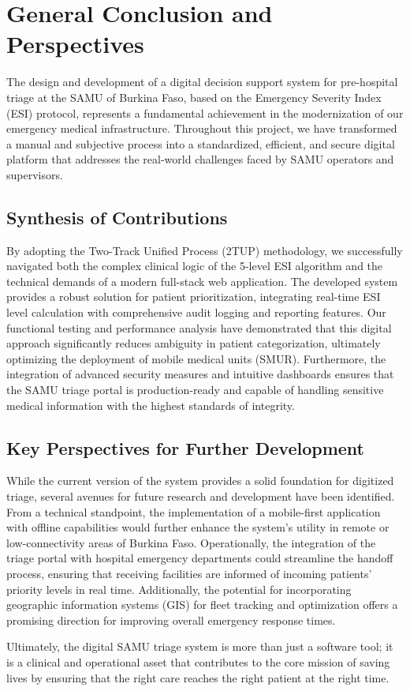 \chapter*{General Conclusion and Perspectives}
\thispagestyle{fancy}
\justifying

The design and development of a digital decision support system for pre-hospital triage at the SAMU of Burkina Faso, based on the Emergency Severity Index (ESI) protocol, represents a fundamental achievement in the modernization of our emergency medical infrastructure. Throughout this project, we have transformed a manual and subjective process into a standardized, efficient, and secure digital platform that addresses the real-world challenges faced by SAMU operators and supervisors.

\section*{Synthesis of Contributions}
By adopting the Two-Track Unified Process (2TUP) methodology, we successfully navigated both the complex clinical logic of the 5-level ESI algorithm and the technical demands of a modern full-stack web application. The developed system provides a robust solution for patient prioritization, integrating real-time ESI level calculation with comprehensive audit logging and reporting features. Our functional testing and performance analysis have demonstrated that this digital approach significantly reduces ambiguity in patient categorization, ultimately optimizing the deployment of mobile medical units (SMUR). Furthermore, the integration of advanced security measures and intuitive dashboards ensures that the SAMU triage portal is production-ready and capable of handling sensitive medical information with the highest standards of integrity.

\section*{Key Perspectives for Further Development}
While the current version of the system provides a solid foundation for digitized triage, several avenues for future research and development have been identified. From a technical standpoint, the implementation of a mobile-first application with offline capabilities would further enhance the system's utility in remote or low-connectivity areas of Burkina Faso. Operationally, the integration of the triage portal with hospital emergency departments could streamline the handoff process, ensuring that receiving facilities are informed of incoming patients' priority levels in real time. Additionally, the potential for incorporating geographic information systems (GIS) for fleet tracking and optimization offers a promising direction for improving overall emergency response times.

Ultimately, the digital SAMU triage system is more than just a software tool; it is a clinical and operational asset that contributes to the core mission of saving lives by ensuring that the right care reaches the right patient at the right time.

\clearpage
